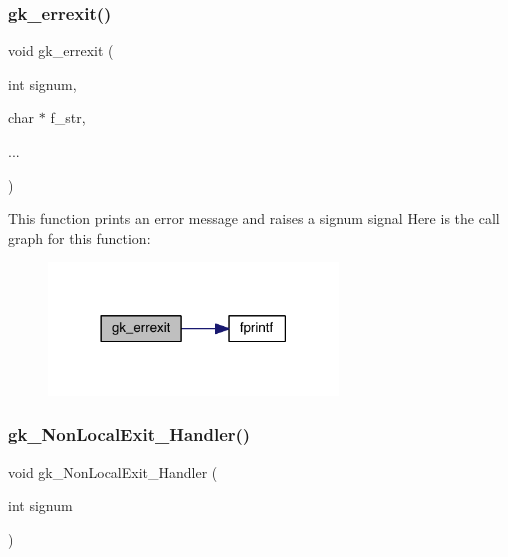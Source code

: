 \subsubsection{\texorpdfstring{gk\+\_\+errexit()}{gk\_errexit()}}
{\footnotesize\ttfamily void gk\+\_\+errexit (\begin{DoxyParamCaption}\item[{int}]{signum,  }\item[{char $\ast$}]{f\+\_\+str,  }\item[{}]{... }\end{DoxyParamCaption})}

This function prints an error message and raises a signum signal Here is the call graph for this function\+:\nopagebreak
\begin{figure}[H]
\begin{center}
\leavevmode
\includegraphics[width=218pt]{a00026_a4c320c13bcdc9967613253ef4c73f59f_cgraph}
\end{center}
\end{figure}
\mbox{\label{a00026_affdaa9477b1f6246649bdb3edd6ae49f}} 
\subsubsection{\texorpdfstring{gk\+\_\+\+Non\+Local\+Exit\+\_\+\+Handler()}{gk\_NonLocalExit\_Handler()}}
{\footnotesize\ttfamily void gk\+\_\+\+Non\+Local\+Exit\+\_\+\+Handler (\begin{DoxyParamCaption}\item[{int}]{signum }\end{DoxyParamCaption})}

\mbox{\label{a00026_ac8478262a791bb8b09708996ad1a548e}} 
